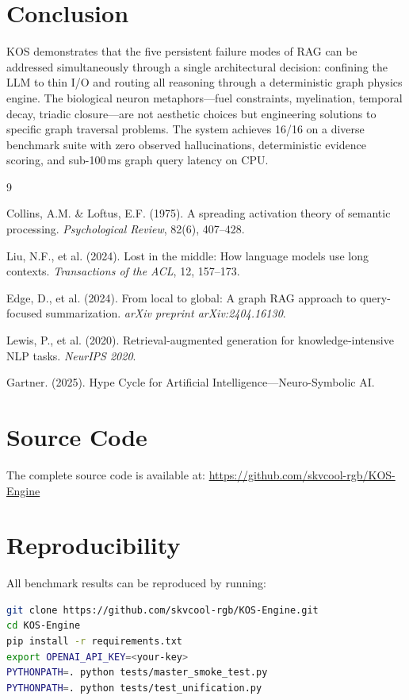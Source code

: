 \documentclass[11pt,a4paper]{article}
\begin{document}
\section{Conclusion}

KOS demonstrates that the five persistent failure modes of RAG can be addressed simultaneously through a single architectural decision: confining the LLM to thin I/O and routing all reasoning through a deterministic graph physics engine. The biological neuron metaphors---fuel constraints, myelination, temporal decay, triadic closure---are not aesthetic choices but engineering solutions to specific graph traversal problems. The system achieves 16/16 on a diverse benchmark suite with zero observed hallucinations, deterministic evidence scoring, and sub-100\,ms graph query latency on CPU.

\begin{thebibliography}{9}

Collins, A.M. \& Loftus, E.F. (1975).
A spreading activation theory of semantic processing.
\textit{Psychological Review}, 82(6), 407--428.

Liu, N.F., et al. (2024).
Lost in the middle: How language models use long contexts.
\textit{Transactions of the ACL}, 12, 157--173.

Edge, D., et al. (2024).
From local to global: A graph RAG approach to query-focused summarization.
\textit{arXiv preprint arXiv:2404.16130}.

Lewis, P., et al. (2020).
Retrieval-augmented generation for knowledge-intensive NLP tasks.
\textit{NeurIPS 2020}.

Gartner. (2025).
Hype Cycle for Artificial Intelligence---Neuro-Symbolic AI.

\end{thebibliography}

\appendix

\section{Source Code}

The complete source code is available at: \url{https://github.com/skvcool-rgb/KOS-Engine}

\section{Reproducibility}

All benchmark results can be reproduced by running:

\begin{lstlisting}[language=bash,caption={Reproducing benchmark results}]
git clone https://github.com/skvcool-rgb/KOS-Engine.git
cd KOS-Engine
pip install -r requirements.txt
export OPENAI_API_KEY=<your-key>
PYTHONPATH=. python tests/master_smoke_test.py
PYTHONPATH=. python tests/test_unification.py
\end{lstlisting}
\end{document}
